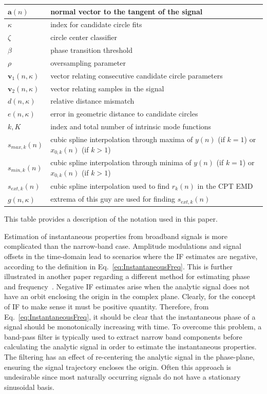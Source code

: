 \documentclass[journal,11pt,a4paper,onecolumn,draftcls]{IEEEtran}
\begin{document}
\begin{table}[!ht]
\begin{tabular}{|l|l|}
	$\mathbf{a}(n)$ & normal vector to the tangent of the signal \\ \hline
	$\kappa$ & index for candidate circle fits \\ \hline
	$\zeta$ & circle center classifier \\ \hline
	$\beta$ & phase transition threshold \\ \hline 
	$\rho$ & oversampling parameter \\ \hline
	$\mathbf{v}_1(n,\kappa)$ & vector relating consecutive candidate circle parameters \\ \hline
	$\mathbf{v}_2(n,\kappa)$ & vector relating samples in the signal\\ \hline
	$d(n,\kappa)$ & relative distance mismatch \\ \hline
	$e(n,\kappa)$ & error in geometric distance to candidate circles \\ \hline
	$k,K$ & index and total number of intrinsic mode functions \\ \hline
	$s_{max,k}(n)$ & cubic spline interpolation through maxima of $y(n)$ (if $k=1$) or $x_{0,k}(n)$ (if $k>1$) \\ \hline
	$s_{min,k}(n)$ & cubic spline interpolation through minima of $y(n)$ (if $k=1$) or $x_{0,k}(n)$ (if $k>1$) \\ \hline
	$s_{ext,k}(n)$ & cubic spline interpolation used to find $r_k(n)$ in the CPT EMD \\ \hline
	$g(n,\kappa)$ & extrema of this guy are used for finding $s_{ext,k}(n)$ \\ \hline 
\end{tabular}
\begin{flushleft}This table provides a description of the notation used in this paper.
\end{flushleft}
\label{tab:Notation}
\end{table}

Estimation of instantaneous properties from broadband signals is more complicated than the narrow-band case. Amplitude modulations and signal offsets in the time-domain lead to scenarios where the IF estimates are negative, according to the definition in Eq.~\ref{eq:InstantaneousFreq}. This is further illustrated in another paper regarding a different method for estimating phase and frequency~\cite{Huang1998}. Negative IF estimates arise when the analytic signal does not have an orbit enclosing the origin in the complex plane. Clearly, for the concept of IF to make sense it must be positive quantity. Therefore, from Eq.~\ref{eq:InstantaneousFreq}, it should be clear that the instantaneous phase of a signal should be monotonically increasing with time. To overcome this problem, a band-pass filter is typically used to extract narrow band components before calculating the analytic signal in order to estimate the instantaneous properties. The filtering has an effect of re-centering the analytic signal in the phase-plane, ensuring the signal trajectory encloses the origin. Often this approach is undesirable since most naturally occurring signals do not have a stationary sinusoidal basis. 
\end{document}
